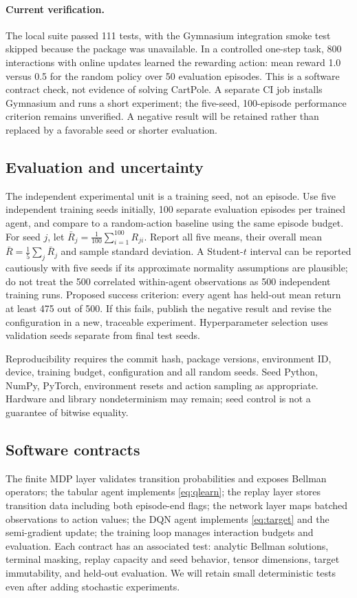 \documentclass[11pt,a4paper]{article}
\begin{document}
\paragraph{Current verification.}
The local suite passed 111 tests, with the Gymnasium integration smoke test
skipped because the package was unavailable. In a controlled one-step task,
800 interactions with online updates learned the rewarding action: mean reward
1.0 versus 0.5 for the random policy over 50 evaluation episodes. This is a
software contract check, not evidence of solving CartPole. A separate CI job
installs Gymnasium and runs a short experiment; the five-seed, 100-episode
performance criterion remains unverified. A negative result will be retained
rather than replaced by a favorable seed or shorter evaluation.

\subsection{Evaluation and uncertainty}
The independent experimental unit is a training seed, not an episode. Use five independent training seeds initially, 100 separate evaluation episodes per trained agent, and compare to a random-action baseline using the same episode budget. For seed $j$, let $\bar R_j=\frac1{100}\sum_{i=1}^{100}R_{ji}$. Report all five means, their overall mean $\bar R=\frac15\sum_j\bar R_j$ and sample standard deviation. A Student-$t$ interval can be reported cautiously with five seeds if its approximate normality assumptions are plausible; do not treat the 500 correlated within-agent observations as 500 independent training runs. Proposed success criterion: every agent has held-out mean return at least 475 out of 500. If this fails, publish the negative result and revise the configuration in a new, traceable experiment. Hyperparameter selection uses validation seeds separate from final test seeds.

Reproducibility requires the commit hash, package versions, environment ID, device, training budget, configuration and all random seeds. Seed Python, NumPy, PyTorch, environment resets and action sampling as appropriate. Hardware and library nondeterminism may remain; seed control is not a guarantee of bitwise equality.

\subsection{Software contracts}
The finite MDP layer validates transition probabilities and exposes Bellman operators; the tabular agent implements \eqref{eq:qlearn}; the replay layer stores transition data including both episode-end flags; the network layer maps batched observations to action values; the DQN agent implements \eqref{eq:target} and the semi-gradient update; the training loop manages interaction budgets and evaluation. Each contract has an associated test: analytic Bellman solutions, terminal masking, replay capacity and seed behavior, tensor dimensions, target immutability, and held-out evaluation. We will retain small deterministic tests even after adding stochastic experiments.
\end{document}
